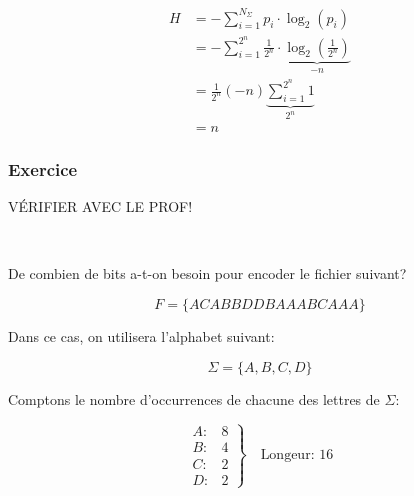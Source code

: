 \documentclass[a4paper,11pt]{article}
\newcommand{\ti}{\cdot}
\begin{document}
\begin{align*}
  H &= - \sum_{i = 1}^{N_{\Sigma}}p_i \ti \log_2(p_i) \\
    &= - \sum_{i = 1}^{2^n} \frac{1}{2^n} \ti \underbrace{\log_2\left(\frac{1}{2^n} \right)}_{- n} \\
    &= \frac{1}{2^n} (-n) \underbrace{\sum_{i = 1}^{2^n} 1}_{2^n} \\
    &= n
\end{align*}

\subsubsection{Exercice}

VÉRIFIER AVEC LE PROF!

\

De combien de bits a-t-on besoin pour encoder le fichier suivant?

$$ F = \{ACABBDDBAAABCAAA\} $$

Dans ce cas, on utilisera l'alphabet suivant:

$$ \Sigma = \{A, B, C, D \} $$

Comptons le nombre d'occurrences de chacune des lettres de $ \Sigma $:

\[\left.
  \begin{array}{lr}
    A: & 8 \\
    B: & 4 \\
    C: & 2 \\
    D: & 2
  \end{array}
\right\} \quad \text{Longeur: 16}
\]
\end{document}

